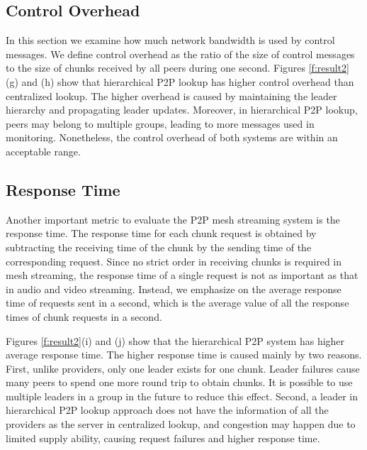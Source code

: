     \subsection{Control Overhead}
    In this section we examine how much network bandwidth is used by
    control messages.
    We define control overhead as the ratio of the size of control
    messages to the size of chunks received by all peers during one
    second.
    Figures
    \ref{f:result2} (g) and (h) show that hierarchical P2P lookup has 
    higher control overhead than centralized lookup.
    The higher overhead is caused by maintaining the
    leader hierarchy and propagating leader updates. 
    Moreover, in
    hierarchical P2P lookup, peers may belong to multiple %
    groups, leading to more messages used in monitoring.
    Nonetheless, the control overhead of both systems are within an
    acceptable range. 
    
\subsection{Response Time}
    Another important metric to evaluate the P2P mesh streaming system
    is the response time. 
    The response time for each chunk request
    is obtained by subtracting the receiving time of the chunk by the
    sending time of the corresponding request.     Since %
    no strict order in receiving
    chunks is required in mesh streaming, the response time of a
    single request is not as important as that in audio and video
    streaming. Instead, we emphasize on the average response time of
    requests sent in a second, which is  %
    the average value of all the response times of chunk requests in a
    second.

    Figures \ref{f:result2}(i) and (j) show that the hierarchical P2P system
    has higher average response time.
    The higher response time is caused mainly by two reasons.
    First, unlike providers, only one leader exists for one chunk.
    Leader failures cause many peers to spend one more round trip
    to obtain chunks. It is possible to use multiple leaders in a
    group in the future to reduce this effect. 
    Second, a leader in hierarchical P2P lookup approach does not have
    the information of all the providers as the server in centralized
    lookup, and congestion may happen due to limited supply ability,  %
    causing request failures and higher response time. %

